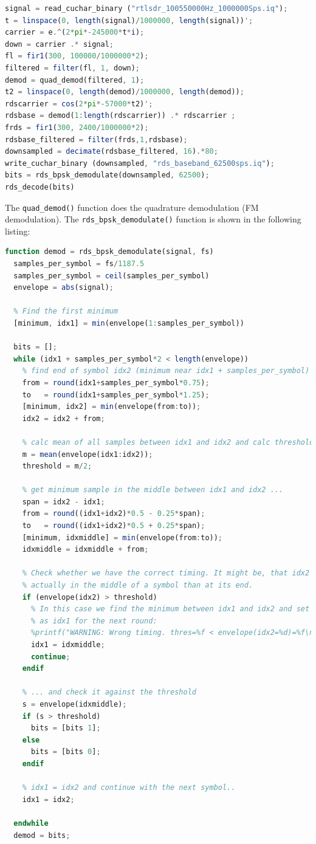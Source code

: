 \begin{lstlisting}[label=lst:octave_rds, caption=Octave implementation of the RDS demodulator, language=octave]
signal = read_cuchar_binary ("rtlsdr_100550000Hz_1000000Sps.iq");
t = linspace(0, length(signal)/1000000, length(signal))';
carrier = e.^(2*pi*-245000*t*i);
down = carrier .* signal;
fl = fir1(300, 100000/1000000*2);
filtered = filter(fl, 1, down);
demod = quad_demod(filtered, 1);
t2 = linspace(0, length(demod)/1000000, length(demod));
rdscarrier = cos(2*pi*-57000*t2)';
rdsbase = demod(1:length(rdscarrier)) .* rdscarrier ;
frds = fir1(300, 2400/1000000*2);
rdsbase_filtered = filter(frds,1,rdsbase);
downsampled = decimate(rdsbase_filtered, 16).*80;
write_cuchar_binary (downsampled, "rds_baseband_62500sps.iq");
bits = rds_bpsk_demodulate(downsampled, 62500);
rds_decode(bits)
\end{lstlisting}

The \texttt{quad\_demod()} function does the quadrature demodulation
(FM demodulation). The \texttt{rds\_bpsk\_demodulate()} function is shown
in the following listing:

\begin{lstlisting}[label=lst:octave_rds_bpsk, caption=Octave implementation of the BPSK demodulation, language=octave]
function demod = rds_bpsk_demodulate(signal, fs)
  samples_per_symbol = fs/1187.5
  samples_per_symbol = ceil(samples_per_symbol)
  envelope = abs(signal);
  
  % Find the first minimum
  [minimum, idx1] = min(envelope(1:samples_per_symbol))
  
  bits = [];
  while (idx1 + samples_per_symbol*2 < length(envelope))
    % find end of symbol idx2 (minimum near idx1 + samples_per_symbol)
    from = round(idx1+samples_per_symbol*0.75);
    to   = round(idx1+samples_per_symbol*1.25);
    [minimum, idx2] = min(envelope(from:to));
    idx2 = idx2 + from;
    
    % calc mean of all samples between idx1 and idx2 and calc threshold = mean/2
    m = mean(envelope(idx1:idx2));
    threshold = m/2;
    
    % get minimum sample in the middle between idx1 and idx2 ...
    span = idx2 - idx1;
    from = round((idx1+idx2)*0.5 - 0.25*span);
    to   = round((idx1+idx2)*0.5 + 0.25*span);
    [minimum, idxmiddle] = min(envelope(from:to));
    idxmiddle = idxmiddle + from;
    
    % Check whether we have the correct timing. It might be, that idx2 is
    % actually in the middle of a symbol than at its end.
    if (envelope(idx2) > threshold)
      % In this case we find the minimum between idx1 and idx2 and set it
      % as idx1 for the next round:
      %printf("WARNING: Wrong timing. thres=%f < envelope(idx2=%d)=%f\n",threshold,idx2,envelope(idx2));
      idx1 = idxmiddle;
      continue;
    endif
    
    % ... and check it against the threshold
    s = envelope(idxmiddle);
    if (s > threshold)
      bits = [bits 1];
    else
      bits = [bits 0];
    endif
    
    % idx1 = idx2 and continue with the next symbol..
    idx1 = idx2;
    
  endwhile
  demod = bits;
\end{lstlisting}


